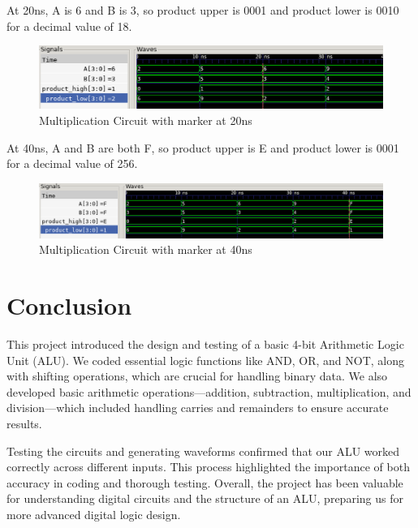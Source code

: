 \documentclass[12pt]{article}
\begin{document}
 At 20ns, A is 6 and B is 3, so product upper is 0001 and product lower is 0010 for a decimal value of 18.  
  \begin{figure}[H]
  \centering 
 \includegraphics[width = 1.0\textwidth]{Multiplication/multiplication_wave1.png}
  \caption{Multiplication Circuit with marker at 20ns}
  \label{fig:enter-label}
  \end{figure}
 
  At 40ns, A and B are both F, so product upper is E and product lower is 0001 for a decimal value of 256.
  \begin{figure}[H]
  \centering 
 \includegraphics[width = 1.0\textwidth]{Multiplication/multiplication_wave2.png}
  \caption{Multiplication Circuit with marker at 40ns}
  \label{fig:enter-label}
  \end{figure}

\section{Conclusion}

This project introduced the design and testing of a basic 4-bit Arithmetic Logic Unit (ALU). We coded essential logic functions like AND, OR, and NOT, along with shifting operations, which are crucial for handling binary data. We also developed basic arithmetic operations—addition, subtraction, multiplication, and division—which included handling carries and remainders to ensure accurate results.

Testing the circuits and generating waveforms confirmed that our ALU worked correctly across different inputs. This process highlighted the importance of both accuracy in coding and thorough testing. Overall, the project has been valuable for understanding digital circuits and the structure of an ALU, preparing us for more advanced digital logic design.
\end{document}
